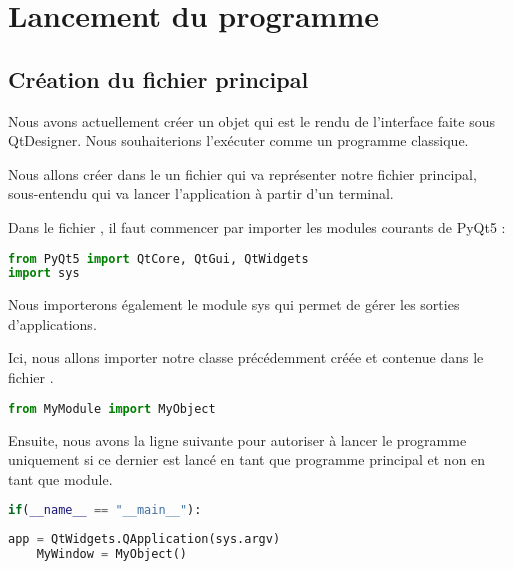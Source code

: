 {\section{Lancement du programme}

\subsection{Création du fichier principal}

Nous avons actuellement créer un objet  qui est le rendu de l'interface faite sous QtDesigner. Nous souhaiterions l'exécuter comme un programme classique. \newline


Nous allons créer dans le  un fichier  qui va représenter notre fichier principal, sous-entendu qui va lancer l'application à partir d'un terminal. \newline


Dans le fichier , il faut commencer par importer les modules courants de PyQt5 : 
\begin{lstlisting}[language=Python]
from PyQt5 import QtCore, QtGui, QtWidgets
import sys
\end{lstlisting}
Nous importerons également le module sys qui permet de gérer les sorties d'applications. \newline

Ici, nous allons importer notre classe  précédemment créée et contenue dans le fichier .
\begin{lstlisting}[language=Python]
from MyModule import MyObject
\end{lstlisting}


Ensuite, nous avons la ligne suivante pour autoriser à lancer le programme uniquement si ce dernier est lancé en tant que programme principal et non en tant que module.

\begin{lstlisting}[language=Python]
if(__name__ == "__main__"):
\end{lstlisting}


\begin{lstlisting}[language=Python]
    app = QtWidgets.QApplication(sys.argv)
    MyWindow = MyObject()
\end{lstlisting}

}
